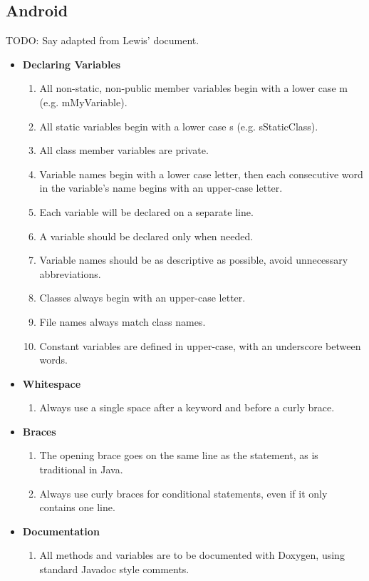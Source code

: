 \documentclass[11pt,a4paper]{article}
\begin{document}
\subsection{Android}
TODO: Say adapted from Lewis' document.
\begin{itemize}
\item \textbf{Declaring Variables}
	\begin{enumerate}
	\item All non-static, non-public member variables begin with a lower case m (e.g. mMyVariable).
	\item All static variables begin with a lower case s (e.g. sStaticClass).
	\item All class member variables are private.
	\item Variable names begin with a lower case letter, then each consecutive word in the variable's name begins with an upper-case letter.
	\item Each variable will be declared on a separate line.
	\item A variable should be declared only when needed.
	\item Variable names should be as descriptive as possible, avoid unnecessary abbreviations.
	\item Classes always begin with an upper-case letter.
	\item File names always match class names.
	\item Constant variables are defined in upper-case, with an underscore between words.
	\end{enumerate}
\item \textbf{Whitespace}
	\begin{enumerate}
	\item Always use a single space after a keyword and before a curly brace.
	\end{enumerate}
\item \textbf{Braces}
	\begin{enumerate}
	\item The opening brace goes on the same line as the statement, as is traditional in Java.
	\item Always use curly braces for conditional statements, even if it only contains one line.
	\end{enumerate}
\item \textbf{Documentation}
	\begin{enumerate}
	\item All methods and variables are to be documented with Doxygen, using standard Javadoc style comments.
	\end{enumerate}
\end{itemize}
\end{document}
